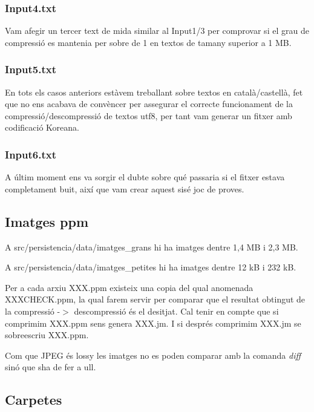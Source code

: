 \subsubsection*{Input4.\+txt}

Vam afegir un tercer text de mida similar al Input1/3 per comprovar si el grau de compressió es mantenia per sobre de 1 en textos de tamany superior a 1 MB.

\subsubsection*{Input5.\+txt}

En tots els casos anteriors estàvem treballant sobre textos en català/castellà, fet que no ens acabava de convèncer per assegurar el correcte funcionament de la compressió/descompressió de textos utf8, per tant vam generar un fitxer amb codificació Koreana.

\subsubsection*{Input6.\+txt}

A últim moment ens va sorgir el dubte sobre qué passaria si el fitxer estava completament buit, així que vam crear aquest sisé joc de proves.

\subsection*{Imatges ppm}

A src/persistencia/data/imatges\+\_\+grans hi ha imatges d\textquotesingle{}entre 1,4 MB i 2,3 MB.

A src/persistencia/data/imatges\+\_\+petites hi ha imatges d\textquotesingle{}entre 12 kB i 232 kB.

Per a cada arxiu X\+X\+X.\+ppm existeix una copia del qual anomenada X\+X\+X\+C\+H\+E\+C\+K.\+ppm, la qual farem servir per comparar que el resultat obtingut de la compressió -\/$>$ descompressió és el desitjat. Cal tenir en compte que si comprimim X\+X\+X.\+ppm se\textquotesingle{}ns genera X\+X\+X.\+jm. I si després comprimim X\+X\+X.\+jm se sobreescriu X\+X\+X.\+ppm.

Com que J\+P\+EG és lossy les imatges no es poden comparar amb la comanda {\itshape diff} sinó que s\textquotesingle{}ha de fer a ull.

\subsection*{Carpetes}

